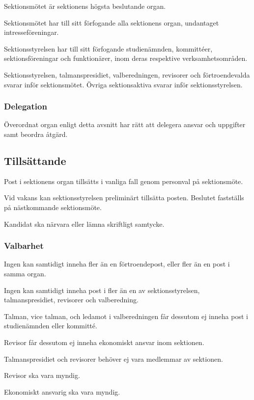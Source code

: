\documentclass{styrdokument}
\begin{document}
\? Sektionsmötet är sektionens högsta beslutande organ.

\? Sektionsmötet har till sitt förfogande alla sektionens organ, undantaget intresseföreningar.

\? Sektionsstyrelsen har till sitt förfogande studienämnden, kommittéer, sektionsföreningar och funktionärer, inom deras respektive verksamhetsområden.

\? Sektionsstyrelsen, talmanspresidiet, valberedningen, revisorer och förtroendevalda svarar inför sektionsmötet.
Övriga sektionsaktiva svarar inför sektionsstyrelsen.

\subsubsection{Delegation}
\? Överordnat organ enligt detta avsnitt har rätt att delegera ansvar och uppgifter samt beordra åtgärd.

\subsection{Tillsättande}

\? Post i sektionens organ tillsätts i vanliga fall genom personval på sektionsmöte.
\label{tills.personval}

\? Vid vakans kan sektionsstyrelsen preliminärt tillsätta posten.
Beslutet fastställs på nästkommande sektionsmöte.

\? Kandidat ska närvara eller lämna skriftligt samtycke.

\subsubsection{Valbarhet}
\? Ingen kan samtidigt inneha fler än en förtroendepost, eller fler än en post i samma organ.

\? Ingen kan samtidigt inneha post i fler än en av sektionsstyrelsen, talmanspresidiet, revisorer och valberedning.

\? Talman, vice talman, och ledamot i valberedningen får dessutom ej inneha post i studienämnden eller kommitté.

\? Revisor får dessutom ej inneha ekonomiskt ansvar inom sektionen.

\? Talmanspresidiet och revisorer behöver ej vara medlemmar av sektionen.

\? Revisor ska vara myndig.

\? Ekonomiskt ansvarig ska vara myndig.
\end{document}
